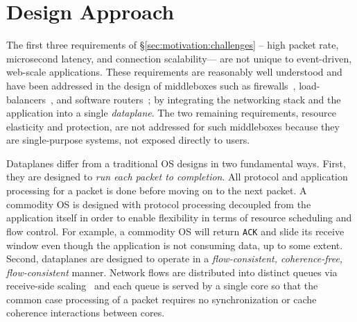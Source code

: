 \section{\ix Design Approach}
\label{sec:design}


The first three requirements of \S\ref{sec:motivation:challenges} --
high packet rate, microsecond latency, and connection scalability---
are not unique to event-driven, web-scale applications.  These
requirements are reasonably well understood and have been addressed in
the design of middleboxes such as firewalls~\cite{missing},
load-balancers~\cite{missing}, and software
routers~\cite{DBLP:journals/tocs/KohlerMCJK00,DBLP:conf/sosp/DobrescuEACFIKMR09};
by integrating the networking stack and the application into a single
\emph{dataplane}. The two remaining requirements, resource elasticity
and protection, are not addressed for such middleboxes because they
are single-purpose systems, not exposed directly to users. 


Dataplanes differ from a traditional OS designs in two fundamental
ways. First, they are designed to \emph{run each packet to
  completion}. All protocol and application processing for a packet is
done before moving on to the next packet.  A commodity OS is designed
with protocol processing decoupled from the application itself in order
to enable flexibility in terms of resource scheduling and flow
control. For example, a commodity OS will return \texttt{ACK} and
slide its receive window even though the application is not consuming
data, up to some extent. Second, dataplanes are designed to operate in
a \emph{flow-consistent, coherence-free, flow-consistent} manner.
Network flows are distributed into distinct queues via receive-side 
scaling~\cite{DBLP:journals/computer/RegnierMIIMHNCF04} and each queue is served by a single core so that
the common case processing of a packet requires no
synchronization or cache coherence interactions between cores.

